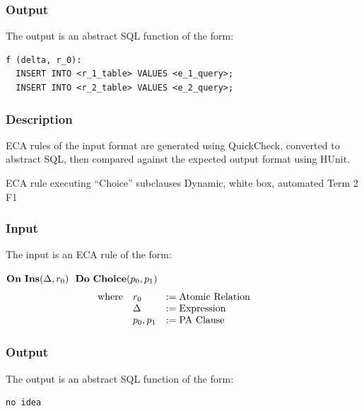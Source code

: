 \documentclass[12pt]{report}
\begin{document}
\vspace{-12pt}\subsubsection*{Output}

The output is an abstract SQL function of the form:
\begin{verbatim}
f (delta, r_0):
  INSERT INTO <r_1_table> VALUES <e_1_query>;
  INSERT INTO <r_2_table> VALUES <e_2_query>;
\end{verbatim}

\vspace{-12pt}\subsubsection*{Description}

ECA rules of the input format are generated using QuickCheck, converted to
  abstract SQL, then compared against the expected output format using HUnit.

{ECA rule executing ``Choice'' subclauses}  %
{Dynamic, white box, automated}  
{Term 2}
{F1}
\vspace{-12pt}\subsubsection*{Input}
The input is an ECA rule of the form:

$\mathbf{On~} \mathbf{Ins}(\Delta,r_0) \,\,\,\,\mathbf{Do~} \mathbf{Choice} ( p_0, p_1 )$
\vspace{-10pt}\[\hspace{-20pt}\begin{array}{lll}
\text{where} & r_0   & := \text{Atomic Relation} \\ 
             & \Delta & := \text{Expression} \\ 
             & p_0, p_1 & := \text{PA Clause} \\
\end{array}\]

\vspace{-12pt}\subsubsection*{Output}

The output is an abstract SQL function of the form:
\begin{verbatim}
no idea
\end{verbatim}
\end{document}
